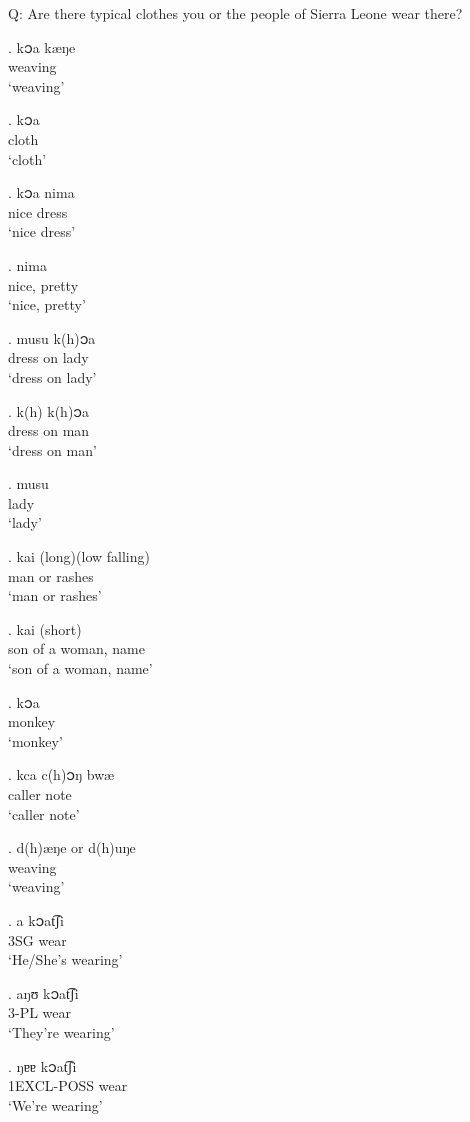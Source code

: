 \documentclass{assets/fieldnotes}
\begin{document}
Q: Are there typical clothes you or the people of Sierra Leone wear there?

\exg. k၁a kæŋe \\
weaving\\
`weaving'

\exg. k၁a \\
cloth\\
`cloth'

\exg. k၁a nima \\
nice dress\\
`nice dress'

\exg. nima \\
nice, pretty\\
`nice, pretty'

\exg. musu k(h)၁a \\
dress on lady\\
`dress on lady'

\exg. k(h) k(h)၁a \\
dress on man\\
`dress on man'

\exg. musu \\
lady\\
`lady'

\exg. kai (long)(low falling)\\
man or rashes\\
`man or rashes'

\exg. kai (short) \\
son of a woman, name\\
`son of a woman, name'

\exg. k၁a \\
monkey\\
`monkey'

\exg. kca  c(h)၁ŋ bwæ\\
caller note\\
`caller note'

\exg. d(h)æŋe or d(h)uŋe  \\
weaving\\
`weaving'

\exg. a k၁at͡ʃi \\
3SG wear\\
`He/She's wearing'

\exg. aŋʊ k၁at͡ʃi \\
3-PL wear\\
`They're wearing'

\exg. ŋɐɐ k၁at͡ʃi\\
1EXCL-POSS wear\\
`We're wearing'
\end{document}
